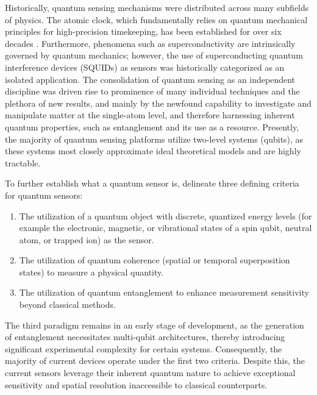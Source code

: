 Historically, quantum sensing mechanisms were distributed across many subfields of physics. The atomic clock, which fundamentally relies on quantum mechanical principles for high-precision timekeeping, has been established for over six decades \cite{essenAtomicStandardFrequency1955}. Furthermore, phenomena such as superconductivity are intrinsically governed by quantum mechanics; however, the use of superconducting quantum interference devices (SQUIDs) as sensors was historically categorized as an isolated application. The consolidation of quantum sensing as an independent discipline was driven rise to prominence of many individual techniques and the plethora of new results, and mainly by the newfound capability to investigate and manipulate matter at the single-atom level, and therefore harnessing inherent quantum properties, such as entanglement and its use as a resource. Presently, the majority of quantum sensing platforms utilize two-level systems (qubits), as these systems most closely approximate ideal theoretical models and are highly tractable.

To further establish what a quantum sensor is, \citeauthor*{degenQuantumSensing2017} delineate three defining criteria for quantum sensors:\label{page:criteria}
\begin{enumerate}
    \item The utilization of a quantum object with discrete, quantized energy levels (for example the electronic, magnetic, or vibrational states of a spin qubit, neutral atom, or trapped ion) as the sensor.
    \item The utilization of quantum coherence (spatial or temporal superposition states) to measure a physical quantity.
    \item The utilization of quantum entanglement to enhance measurement sensitivity beyond classical methods.
\end{enumerate}

The third paradigm remains in an early stage of development, as the generation of entanglement necessitates multi-qubit architectures, thereby introducing significant experimental complexity for certain systems. Consequently, the majority of current devices operate under the first two criteria. Despite this, the current sensors leverage their inherent quantum nature to achieve exceptional sensitivity and spatial resolution inaccessible to classical counterparts.

